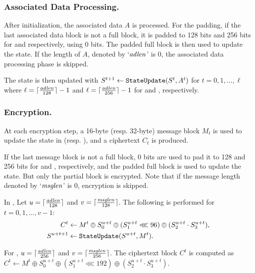 \subsubsection{Associated Data Processing.}
After initialization, the associated data $A$ is processed. For the padding, if the last associated data block is not a full block,  it is padded to 128 bits and 256 bits for  and  respectively, using 0 bits. The padded full block is then used to update the state. If the length of $A$, denoted by `${\it adlen}$' is 0, the associated data processing phase is skipped.

The state is then updated with $S^{t+1} \leftarrow \texttt{StateUpdate}{}(S^t, A^t)$ for $t=0,1,\ldots,\ell$ where $\ell = \lceil \frac{{\it adlen}}{128} \rceil -1$ and $\ell = \lceil \frac{{\it adlen}}{256} \rceil -1$ for  and , respectively.

\subsubsection{Encryption.}
At each encryption step, a 16-byte (resp. 32-byte) message block $M_t$ is used to update the state in  (resp. ), and a ciphertext $C_t$ is produced.

If the last message block is not a full block, 0 bits are used to pad it to 128 and 256 bits for  and , respectively, and the padded full block is used to update the state. But only the partial block is encrypted. Note that if the message length denoted by `${\it msglen}$' is 0, encryption is skipped.

In , Let $u = \lceil \frac{{\it adlen}}{128} \rceil$ and $v = \lceil \frac{{\it msglen}}{128} \rceil$. The following is performed for $t=0, 1, \ldots, v-1$:
\begin{align*}
C^t &\leftarrow M^t \oplus S^{u+t}_0 \oplus (S^{u+t}_1 \lll 96) \oplus (S^{u+t}_2 \cdot S^{u+t}_3),\\
S^{u+t+1} &\leftarrow \texttt{StateUpdate}{}(S^{u+t},M^t).
\end{align*}

For , $u = \lceil \frac{{\it adlen}}{256} \rceil$ and $v = \lceil \frac{{\it msglen}}{256} \rceil$. The ciphertext block $C^t$ is computed as $C^t \leftarrow M^t \oplus S^{u+t}_0 \oplus (S^{u+t}_1 \lll 192) \oplus (S^{u+t}_2 \cdot S^{u+t}_3)$.


